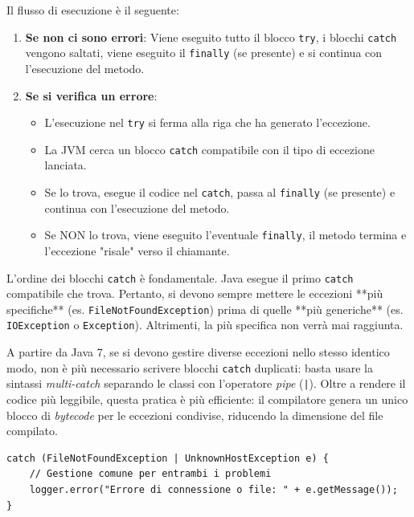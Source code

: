 Il flusso di esecuzione è il seguente:

\begin{enumerate}
    \item \textbf{Se non ci sono errori}: Viene eseguito tutto il blocco \texttt{try}, i blocchi \texttt{catch} vengono saltati, viene eseguito il \texttt{finally} (se presente) e si continua con l'esecuzione del metodo.
    \item \textbf{Se si verifica un errore}: 
    \begin{itemize}
        \item L'esecuzione nel \texttt{try} si ferma alla riga che ha generato l'eccezione.
        \item La JVM cerca un blocco \texttt{catch} compatibile con il tipo di eccezione lanciata.
        \item Se lo trova, esegue il codice nel \texttt{catch}, passa al \texttt{finally} (se presente) e continua con l'esecuzione del metodo. 
        \item Se NON lo trova, viene eseguito l'eventuale \texttt{finally}, il metodo termina e l'eccezione "risale" verso il chiamante.
    \end{itemize}
\end{enumerate}

\begin{warningbox}
L'ordine dei blocchi \texttt{catch} è fondamentale. Java esegue il primo \texttt{catch} compatibile che trova. Pertanto, si devono sempre mettere le eccezioni **più specifiche** (es. \texttt{FileNotFoundException}) prima di quelle **più generiche** (es. \texttt{IOException} o \texttt{Exception}). Altrimenti, la più specifica non verrà mai raggiunta.
\end{warningbox}

A partire da Java 7, se si devono gestire diverse eccezioni nello stesso identico modo, non è più necessario scrivere blocchi \texttt{catch} duplicati: basta usare la sintassi \textit{multi-catch} separando le classi con l'operatore \textit{pipe} (\texttt{|}). Oltre a rendere il codice più leggibile, questa pratica è più efficiente: il compilatore genera un unico blocco di \textit{bytecode} per le eccezioni condivise, riducendo la dimensione del file compilato.
\begin{lstlisting}[caption={Esempio di multi-catch}]
    catch (FileNotFoundException | UnknownHostException e) {
    // Gestione comune per entrambi i problemi
    logger.error("Errore di connessione o file: " + e.getMessage());
}
\end{lstlisting}

